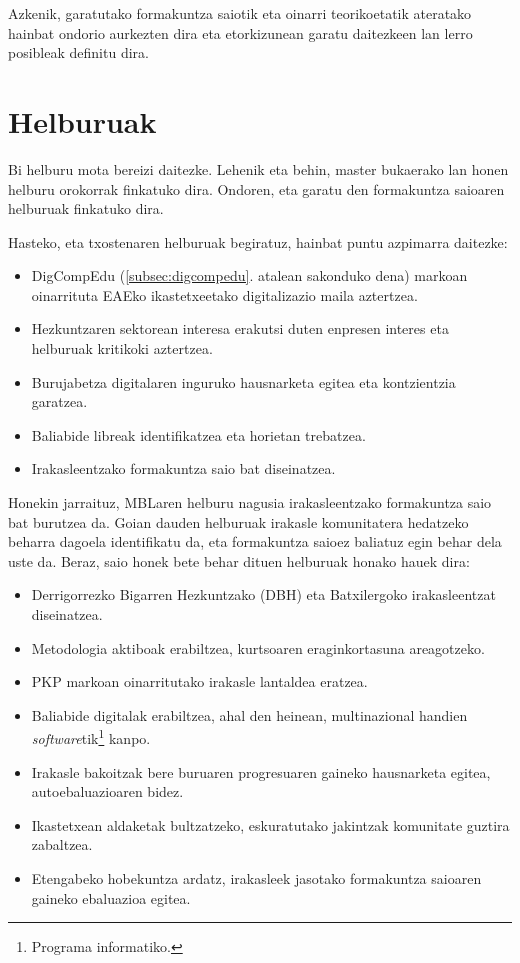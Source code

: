 Azkenik, garatutako formakuntza saiotik eta oinarri teorikoetatik ateratako hainbat ondorio aurkezten dira eta etorkizunean garatu daitezkeen lan lerro posibleak definitu dira.\\

{\let\clearpage\relax \chapter{Helburuak}\label{cha:helburuak}}

Bi helburu mota bereizi daitezke. Lehenik eta behin, master bukaerako lan honen helburu orokorrak finkatuko dira. Ondoren, eta garatu den formakuntza saioaren helburuak finkatuko dira.

Hasteko, eta txostenaren helburuak begiratuz, hainbat puntu azpimarra daitezke:
\begin{itemize}
    \item DigCompEdu (\ref{subsec:digcompedu}. atalean sakonduko dena) markoan oinarrituta EAEko ikastetxeetako digitalizazio maila aztertzea.
    \item Hezkuntzaren sektorean interesa erakutsi duten enpresen interes eta helburuak kritikoki aztertzea.
    \item Burujabetza digitalaren inguruko hausnarketa egitea eta kontzientzia garatzea.
    \item Baliabide libreak identifikatzea eta horietan trebatzea.
    \item Irakasleentzako formakuntza saio bat diseinatzea.
\end{itemize}

Honekin jarraituz, MBLaren helburu nagusia irakasleentzako formakuntza saio bat burutzea da. Goian dauden helburuak irakasle komunitatera hedatzeko beharra dagoela identifikatu da, eta formakuntza saioez baliatuz egin behar dela uste da. Beraz, saio honek bete behar dituen helburuak honako hauek dira:
\begin{itemize}
    \item Derrigorrezko Bigarren Hezkuntzako (DBH) eta Batxilergoko irakasleentzat diseinatzea.
    \item Metodologia aktiboak erabiltzea, kurtsoaren eraginkortasuna areagotzeko.
    \item PKP markoan oinarritutako irakasle lantaldea eratzea.
    \item Baliabide digitalak erabiltzea, ahal den heinean, multinazional handien \textit{software}tik\footnote{Programa informatiko.} kanpo.
    \item Irakasle bakoitzak bere buruaren progresuaren gaineko hausnarketa egitea, autoebaluazioaren bidez.
    \item Ikastetxean aldaketak bultzatzeko, eskuratutako jakintzak komunitate guztira zabaltzea.
    \item Etengabeko hobekuntza ardatz, irakasleek jasotako formakuntza saioaren gaineko ebaluazioa egitea.
\end{itemize}

